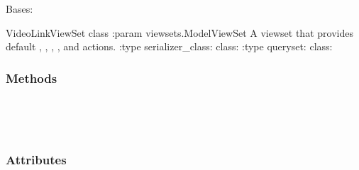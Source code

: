 \documentclass[letterpaper,10pt,english]{sphinxmanual}
\begin{document}
\begin{fulllineitems}
\label{\detokenize{vtcvlp:vtcuser.api.VideoLinkViewSet}}
Bases: 

VideoLinkViewSet class
:param viewsets.ModelViewSet A viewset that provides default , , , ,  and  actions.
:type serializer\_class: class: 
:type queryset: class: 
\subsubsection*{Methods}


\begin{savenotes}\sphinxatlongtablestart\begin{longtable}[c]{}
\hline

\endfirsthead

%
{}\\
\hline

\endhead

\hline
{}\\
\endfoot

\endlastfoot

\end{longtable}\sphinxatlongtableend\end{savenotes}
\subsubsection*{Attributes}


\begin{savenotes}\sphinxatlongtablestart\begin{longtable}[c]{}
\hline

\endfirsthead

%
{}\\
\hline


\end{longtable}
\end{savenotes}
\end{fulllineitems}
\end{document}
